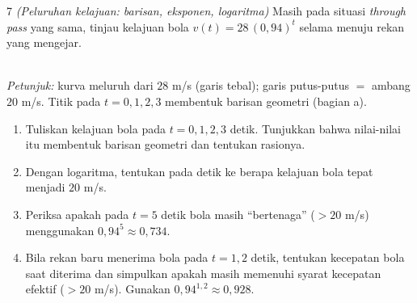 \documentclass[11pt]{article}
\newenvironment{subsoal}{%
  \begin{enumerate}[label=\textbf{(\alph*)},leftmargin=1.8em,itemsep=5pt,topsep=3pt]}%
  {\end{enumerate}}
\begin{document}
\begin{soal}{7 \normalfont\itshape(Peluruhan kelajuan: barisan, eksponen, logaritma)}
Masih pada situasi \textit{through pass} yang sama, tinjau kelajuan bola
$v(t)=28\,(0{,}94)^{t}$ selama menuju rekan yang mengejar.

\begin{center}
\\[2pt]
{\small\textit{Petunjuk:} kurva meluruh dari $28$ m/s (garis tebal); garis putus-putus $=$ ambang $20$ m/s. Titik pada $t=0,1,2,3$ membentuk barisan geometri (bagian a).}
\end{center}

\begin{subsoal}
  \item Tuliskan kelajuan bola pada $t=0,1,2,3$ detik. Tunjukkan bahwa nilai-nilai
        itu membentuk barisan geometri dan tentukan rasionya.
  \item Dengan logaritma, tentukan pada detik ke berapa kelajuan bola tepat
        menjadi $20$ m/s.
  \item Periksa apakah pada $t=5$ detik bola masih ``bertenaga'' ($>20$ m/s)
        menggunakan $0{,}94^{5}\approx0{,}734$.
  \item Bila rekan baru menerima bola pada $t=1{,}2$ detik, tentukan kecepatan
        bola saat diterima dan simpulkan apakah masih memenuhi syarat kecepatan
        efektif ($>20$ m/s). Gunakan $0{,}94^{1{,}2}\approx0{,}928$.
\end{subsoal}
\end{soal}
\end{document}
